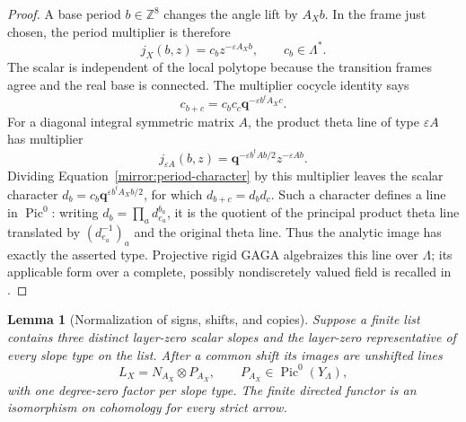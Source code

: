 \documentclass[11pt]{article}
\newtheorem{lemma}[theorem]{Lemma}
\theoremstyle{definition}
\theoremstyle{remark}
\numberwithin{equation}{section}
\begin{document}
\begin{proof}
A base period $b\in\mathbb Z^8$ changes the angle lift by $A_Xb$.
In the frame just chosen, the period multiplier is therefore
\begin{equation}
 j_X(b,z)=c_bz^{-\varepsilon A_Xb},\qquad c_b\in\Lambda^*.
 \label{mirror:period-character}
\end{equation}
The scalar is independent of the local polytope because the
transition frames agree and the real base is connected.  The
multiplier cocycle identity says
\[
 c_{b+c}=c_bc_c\mathbf q^{-\varepsilon b^tA_Xc}.
\]
For a diagonal integral symmetric matrix $A$, the product theta line
of type $\varepsilon A$ has multiplier
\[
 j_{\varepsilon A}(b,z)
   =\mathbf q^{-\varepsilon b^tAb/2}z^{-\varepsilon Ab}.
\]
Dividing Equation~\eqref{mirror:period-character} by this multiplier
leaves the scalar character
$d_b=c_b\mathbf q^{\varepsilon b^tA_Xb/2}$, for which
$d_{b+c}=d_bd_c$.  Such a character defines a line in $\operatorname{Pic}^0$:
writing $d_b=\prod_a d_{e_a}^{b_a}$, it is the quotient of the
principal product theta line translated by
$(d_{e_a}^{-1})_a$ and the original theta line.  Thus the analytic
image has exactly the asserted type.  Projective rigid GAGA
algebraizes this line over $\Lambda$; its applicable form over a
complete, possibly nondiscretely valued field is recalled in
\cite[p.~502]{conrad-gaga}.
\end{proof}

\begin{lemma}[Normalization of signs, shifts, and copies]
\label{mirror:normalization}
Suppose a finite list contains three distinct layer-zero scalar
slopes and the layer-zero representative of every slope type on the
list.  After a common shift its images are unshifted lines
\begin{equation}
 L_X=N_{A_X}\otimes P_{A_X},\qquad
 P_{A_X}\in\operatorname{Pic}^0(Y_\Lambda),
 \label{mirror:normalized-lines}
\end{equation}
with one degree-zero factor per slope type.  The finite directed
functor is an isomorphism on cohomology for every strict arrow.
\end{lemma}
\end{document}
